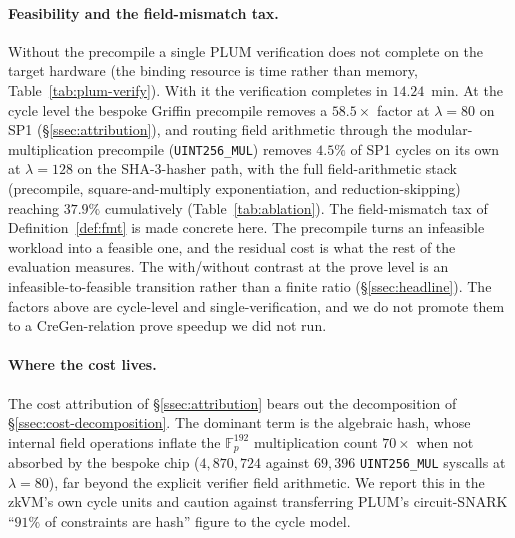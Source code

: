 \paragraph{Feasibility and the field-mismatch tax.}
Without the precompile a single PLUM verification does not complete on the target hardware (the binding resource is time rather than memory, Table~\ref{tab:plum-verify}). With it the verification completes in $14.24$~min. At the cycle level the bespoke Griffin precompile removes a $58.5\times$ factor at $\lambda=80$ on SP1 (\S\ref{ssec:attribution}), and routing field arithmetic through the modular-multiplication precompile (\texttt{UINT256\_MUL}) removes $4.5\%$ of SP1 cycles on its own at $\lambda=128$ on the SHA-3-hasher path, with the full field-arithmetic stack (precompile, square-and-multiply exponentiation, and reduction-skipping) reaching $37.9\%$ cumulatively (Table~\ref{tab:ablation}). The field-mismatch tax of Definition~\ref{def:fmt} is made concrete here. The precompile turns an infeasible workload into a feasible one, and the residual cost is what the rest of the evaluation measures. The with/without contrast at the prove level is an infeasible-to-feasible transition rather than a finite ratio (\S\ref{ssec:headline}). The factors above are cycle-level and single-verification, and we do not promote them to a CreGen-relation prove speedup we did not run.

\paragraph{Where the cost lives.}
The cost attribution of \S\ref{ssec:attribution} bears out the decomposition of \S\ref{ssec:cost-decomposition}. The dominant term is the algebraic hash, whose internal field operations inflate the $\mathbb{F}_p^{192}$ multiplication count $70\times$ when not absorbed by the bespoke chip ($4{,}870{,}724$ against $69{,}396$ \texttt{UINT256\_MUL} syscalls at $\lambda=80$), far beyond the explicit verifier field arithmetic. We report this in the zkVM's own cycle units and caution against transferring PLUM's circuit-SNARK ``$91\%$ of constraints are hash'' figure to the cycle model.

